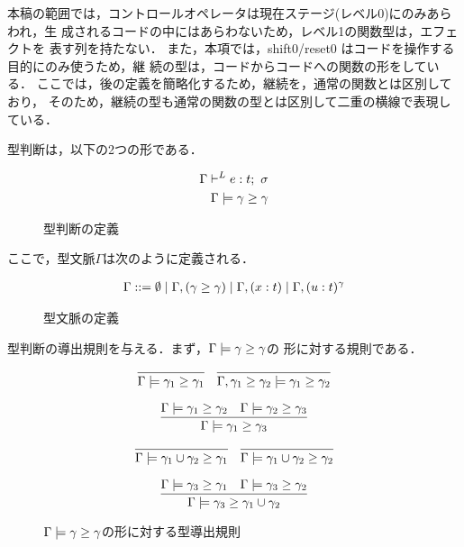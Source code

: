 本稿の範囲では，コントロールオペレータは現在ステージ(レベル0)にのみあらわれ，生
成されるコードの中にはあらわないため，レベル1の関数型は，エフェクトを
表す列を持たない．
また，本項では，shift0/reset0 はコードを操作する目的にのみ使うため，継
続の型は，コードからコードへの関数の形をしている．
ここでは，後の定義を簡略化するため，継続を，通常の関数とは区別しており，
そのため，継続の型も通常の関数の型とは区別して二重の横線で表現している．

型判断は，以下の2つの形である．

\begin{figure}[H]
  \centering
  \begin{align*}
    \Gamma \vdash^{L} e : t ;~\sigma \\
    \Gamma \models \gamma \ge \gamma
  \end{align*}
  \caption{型判断の定義}
  \label{fig:judgement_def}
\end{figure}

ここで，型文脈$\Gamma$は次のように定義される．

\begin{figure}[H]
  \centering
  \begin{align*}
    \Gamma ::= \emptyset
    \mid \Gamma, (\gamma \ge \gamma)
    \mid \Gamma, (x : t)
    \mid \Gamma, (u : t)^{\gamma}
  \end{align*}
  \caption{型文脈の定義}
  \label{fig:type_context_def}
\end{figure}


型判断の導出規則を与える．まず，$\Gamma \models \gamma \ge \gamma$の
形に対する規則である．

\begin{figure}[H]
  \centering
  \[
    \infer
    {\Gamma \models \gamma_1 \ord \gamma_1}
    {}
    \quad
    \infer
    {\Gamma, \gamma_1 \ord \gamma_2 \models \gamma_1 \ord \gamma_2}
    {}
  \]

  \[
    \infer
    {\Gamma \models \gamma_1 \ord \gamma_3}
    {\Gamma \models \gamma_1 \ord \gamma_2 & \Gamma \models \gamma_2 \ord \gamma_3}
  \]

  \[
    \infer
    {\Gamma \models \gamma_1 \cup \gamma_2 \ord \gamma_1}
    {}
    \quad
    \infer
    {\Gamma \models \gamma_1 \cup \gamma_2 \ord \gamma_2}
    {}
  \]

  \[
    \infer
    {\Gamma \models \gamma_3 \ord \gamma_1 \cup \gamma_2}
    {\Gamma \models \gamma_3 \ord \gamma_1
      &\Gamma \models \gamma_3 \ord \gamma_2}
  \]
  \caption{$\Gamma \models \gamma \ge \gamma$の形に対する型導出規則}
  \label{fig:gmg_rule}
\end{figure}



